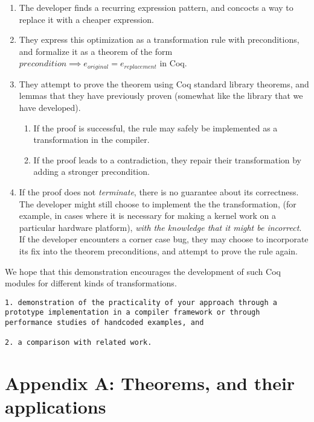 \begin{enumerate}
\def\labelenumi{\arabic{enumi}.}
\item
  The developer finds a recurring expression pattern, and concocts a way
  to replace it with a cheaper expression.
\item
  They express this optimization as a transformation rule with
  preconditions, and formalize it as a theorem of the form
  \(precondition \implies e_{original} = e_{replacement}\) in Coq.
\item
  They attempt to prove the theorem using Coq standard library theorems,
  and lemmas that they have previously proven (somewhat like the library
  that we have developed).

  \begin{enumerate}
  \def\labelenumii{\roman{enumii}.}
  \tightlist
  \item
    If the proof is successful, the rule may safely be implemented as a
    transformation in the compiler.
  \item
    If the proof leads to a contradiction, they repair their
    transformation by adding a stronger precondition.
  \end{enumerate}
\item
  If the proof does not \emph{terminate}, there is no guarantee about
  its correctness. The developer might still choose to implement the the
  transformation, (for example, in cases where it is necessary for
  making a kernel work on a particular hardware platform), \emph{with
  the knowledge that it might be incorrect}. If the developer encounters
  a corner case bug, they may choose to incorporate its fix into the
  theorem preconditions, and attempt to prove the rule again.
\end{enumerate}

We hope that this demonstration encourages the development of such Coq
modules for different kinds of transformations.

\begin{verbatim}
1. demonstration of the practicality of your approach through a prototype implementation in a compiler framework or through performance studies of handcoded examples, and 

2. a comparison with related work.
\end{verbatim}

\hypertarget{theorems}{%
\section{Appendix A: Theorems, and their applications}\label{theorems}}

